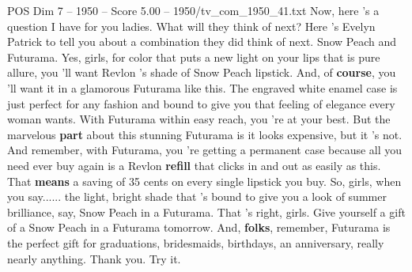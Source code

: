 \begin{textsample}{POS Dim 7 – 1950 – Score 5.00 – 1950/tv\_com\_1950\_41.txt}  \label{ex:f7_pos_003}
Now, here 's a question I have for you ladies.
What will they think of next?
Here 's Evelyn Patrick to tell you about a combination they did think of next.
Snow Peach and Futurama.
Yes, girls, for color that puts a new light on your lips that is pure allure, you 'll want Revlon 's shade of Snow Peach lipstick.
And, of \textbf{course}, you 'll want it in a glamorous Futurama like this.
The engraved white enamel case is just perfect for any fashion and bound to give you that feeling of elegance every woman wants.
With Futurama within easy reach, you 're at your best.
But the marvelous \textbf{part} about this stunning Futurama is it looks expensive, but it 's not.
And remember, with Futurama, you 're getting a permanent case because all you need ever buy again is a Revlon \textbf{refill} that clicks in and out as easily as this.
That \textbf{means} a saving of 35 cents on every single lipstick you buy.
So, girls, when you say...... the light, bright shade that 's bound to give you a look of summer brilliance, say, Snow Peach in a Futurama.
That 's right, girls.
Give yourself a gift of a Snow Peach in a Futurama tomorrow.
And, \textbf{folks}, remember, Futurama is the perfect gift for graduations, bridesmaids, birthdays, an anniversary, really nearly anything.
Thank you.
Try it.

\end{textsample}
